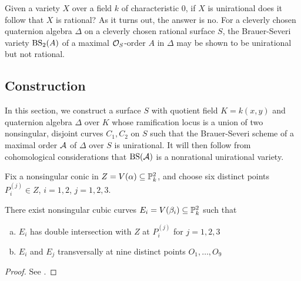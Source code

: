 Given a variety $X$ over a field $k$ of characteristic $0$, if $X$ is unirational does it follow that $X$ is rational?  As it turns out, the answer is no.  For a cleverly chosen quaternion algebra $\Delta$ on a cleverly chosen rational surface $S$, the Brauer-Severi variety $\textnormal{BS}_2(A)$ of a maximal $\mathcal{O}_S$-order $A$ in $\Delta$ may be shown to be unirational but not rational.

\subsection{Construction}
In this section, we construct a surface $S$ with quotient field $K = k(x,y)$ and quaternion algebra $\Delta$ over $K$ whose ramification locus is a union of two nonsingular, disjoint curves $C_1,C_2$ on $S$ such that the Brauer-Severi scheme of a maximal order $\mathcal{A}$ of $\Delta$ over $S$ is unirational.  It will then follow from cohomological considerations that $\textnormal{BS}(\mathcal{A})$ is a nonrational unirational variety.

Fix a nonsingular conic in $Z = V(\alpha)\subseteq \mathbb{P}^2_k$, and choose six distinct points $P_i^{(j)}\in Z$, $i=1,2$, $j=1,2,3$.
\begin{lem}
There exist nonsingular cubic curves $E_i = V(\beta_i) \subseteq \mathbb{P}^2_k$ such that
\begin{enumerate}[(a)]
\item  $E_i$ has double intersection with $Z$ at $P_i^{(j)}$ for $j=1,2,3$
\item  $E_i$ and $E_j$ transversally at nine distinct points $O_1,\dots,O_9$
\end{enumerate}
\end{lem}
\begin{proof}
See \cite{artin1972some}.
\end{proof}

